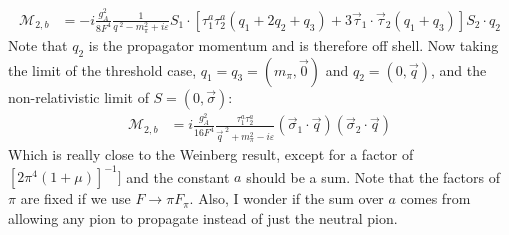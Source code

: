 \documentclass[11pt]{article}
\newcommand\mm{\mathcal{M}}
\begin{document}
\begin{align}
 \mm_{2,b}&=-i\frac{g_A^2}{8F^4}\frac{1}{q^{\;2}- m_\pi^2 + i \varepsilon} S_1 \cdot \left[ \tau_1^a\tau_2^a (q_1+2q_2+q_3) +3\vec{\tau}_1 \cdot \vec{\tau}_2 (q_1+q_3)\right] S_2 \cdot q_2
\end{align}
Note that $q_2$ is the propagator momentum and is therefore off shell.
Now taking the limit of the threshold case, $q_1=q_3=(m_\pi, \vec{0})$ and $q_2=(0,\vec{q})$, and the non-relativistic limit of $S=(0,\vec{\sigma})$:
\begin{align}
    \mm_{2,b}&=i\frac{g_A^2}{16F^4}\frac{\tau_1^a\tau_2^a}{\vec{q}^{\;2}+ m_\pi^2 - i \varepsilon}\left(\vec{\sigma}_1 \cdot \vec{q} \right)\left(\vec{\sigma}_2 \cdot \vec{q}\right)
\end{align}
Which is really close to the Weinberg result, except for a factor of $\left[2\pi^4 \left( 1+\mu \right)\right]^{-1}]$ and the constant $a$ should be a sum. Note that the factors of $\pi$ are fixed if we use $F \to \pi F_\pi$.
Also, I wonder if the sum over $a$ comes from allowing any pion to propagate instead of just the neutral pion.

\end{document}
